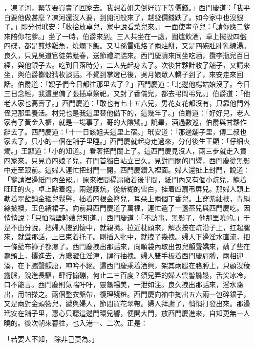 ，凍了河，緊等要買賣了回家去。我想着姐夫倒好買下等價錢。」西門慶道：「我平白要他做甚麼？凍河還沒人要，到開河般來了，越發價錢跌了。如今家中也沒銀子。」即分付玳安：「收拾放卓兒，家中說看菜兒來。」一面使畫童兒：「請你應二爹來陪你花爹。」坐了一時，伯爵來到。三人共坐在一處，圍爐飲酒，卓上擺設四盤四碟，都是煎炒雞魚，燒爛下飯。又叫孫雪娥烙了兩炷餅，又是四碗肚肺乳線湯。良久，只見吳道官徒弟應春，送節禮疏誥來。西門慶請來同坐吃酒，攬李瓶兒百日經，與他銀子去。吃到日落時分，二人先起身去了。次後甘夥計收了舖子，又請來坐，與伯爵擲骰猜枚談話。不覺到掌燈已後，吳月娘眾人轎子到了，來安走來回話。伯爵道：「嫂子們今日都往那里去了？」西門慶道：「北邊他楊姑娘沒了。今日三日念經，我這里備了張插卓祭祀，又封了香儀兒，都去弔問弔兒。」伯爵道：「他老人家也高壽了。」西門慶道：「敢也有七十五六兒，男花女花都沒有，只靠他門外侄兒那里養活。材兒也是我這里替他備下的，這幾年了。」伯爵道：「好好兒，老人家有了黃金入櫃，就是一場事了，哥的大陰騭。」說畢，酒過數巡，伯爵與甘夥作辭去了。西門慶道：「十一日該姐夫這里上宿。」玳安道：「那邊舖子里，傅二叔也家去了，只小的一個在舖子里睡。」西門慶就起身走過來，分付後生王顯：「仔細火燭。」王顯道：「小的知道。」看著把門關上了。這西門慶見沒人，兩三步就走入賁四家來。只見賁四娘子兒，在門首獨自站立已久。見對門關的門響，西門慶從黑影中走至跟前。這婦人連忙把封門一開，西門慶鑽入裡面。婦人還扯上封門，說道：「爹請裡邊紙門內坐罷。」原來裡間槅扇廂着後半間，紙門內又有個小炕兒，籠着旺旺的火，卓上點着燈，兩邊護炕，從新糊的雪白，挂着四扇弔屏兒。那婦人頭上勒着翠藍銷金箍兒䯼髻，插着四根金簪兒，耳朵上兩個丁香兒。上穿紫紬襖，青綃絲披襖，玉色綃裙子。向前與西門慶道了萬福，連忙遞了一盞茶兒與西門慶吃。因悄悄說：「只怕隔壁韓嫂兒知道。」西門慶道：「不訪事，黑影子，他那里曉的。」于是不由分說，把婦人摟到懷中，就親嘴。拉近枕頭來，解衣按在炕沿子上，扛起腿來，就聳那話，上已束着托子。剛插入牝中，就拽了幾拽。婦人下邊淫水直流，把一條藍布褲子都濕了。西門慶拽出那話來，向順袋內取出包兒顫聲嬌來，蘸了些在龜頭上，攮進去，方纔澀住淫津，肆行抽拽。婦人雙手板着西門慶肩膊，兩相迎湊，在下颺聲顫語，呻吟不絕。這西門慶乘着酒興，架其兩腿在胳膊上，只顧沒稜露腦，銳進長驅，肆行搧磞，何止二三百度？須兒弄的婦人雲髻鬅鬆，舌尖冰冷，口不能言。西門慶則氣喘吁吁，靈龜暢美，一泄如注。良久拽出那話來，淫水隨出，用帕搽之。兩個整衣繫帶，復理殘粧。西門慶向袖中掏出五六兩一包碎銀子，又是兩對金頭簪兒，遞與婦人，節間買花翠帶。婦人拜謝了，悄悄打發出來。那邊玳安在舖子里，惠心只聽這邊門環兒響，便開大門，放西門慶進來，自知更無一人曉的。後次朝來暮往，也入港一、二次。正是：

「若要人不知，  除非己莫為。」

